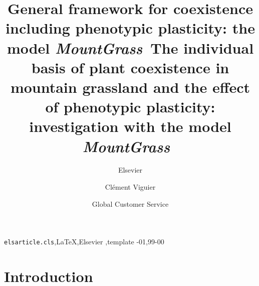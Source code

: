 \documentclass[review]{elsarticle}
\newcommand{\model}{\textbf{\textit{MountGrass}}~}
\begin{document}
\begin{frontmatter}

\title{General framework for coexistence including phenotypic plasticity: the model \model}
\title{The individual basis of plant coexistence in mountain grassland and the effect of phenotypic plasticity: investigation with the model \model}

\author{Elsevier}
\address{Radarweg 29, Amsterdam}

\author[clement.viguier@irstea.fr,mysecondaryaddress]{Clément Viguier}

\author[mysecondaryaddress]{Global Customer Service}

\address[mymainaddress]{1600 John F Kennedy Boulevard, Philadelphia}
\address[mysecondaryaddress]{360 Park Avenue South, New York}

\begin{abstract}
\end{abstract}

\begin{keyword}
\texttt{elsarticle.cls}\sep \LaTeX\sep Elsevier \sep template
-01\sep  99-00
\end{keyword}

\end{frontmatter}

\linenumbers

\section{Introduction}
\end{document}
